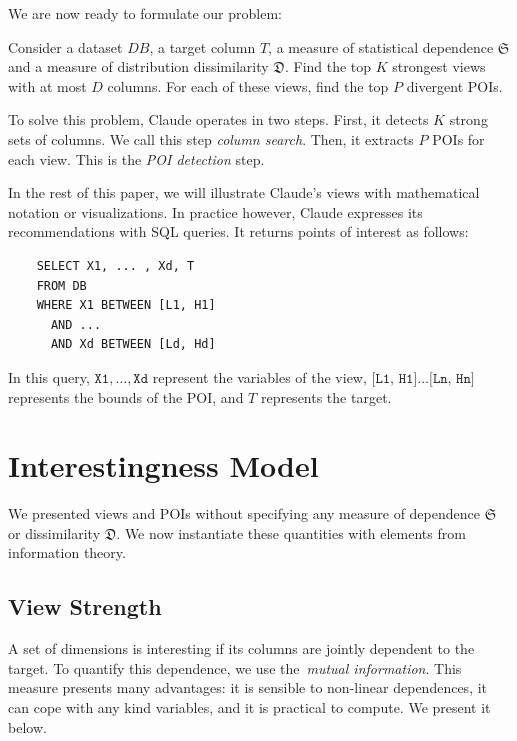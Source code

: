 We are now ready to formulate our problem:
\begin{problem}
Consider a dataset $DB$, a target column $T$, a measure of statistical
dependence $\mathfrak{S}$ and a measure of distribution dissimilarity
$\mathfrak{D}$. Find the top $K$ strongest views with at most $D$ columns. For
each of these views, find the top $P$ divergent POIs.
\end{problem}
To solve this problem, Claude operates in two steps. First, it detects $K$
strong sets of columns.  We call this step \emph{column search}.  Then, it
extracts $P$ POIs for each view. This is the \emph{POI detection} step.

In the rest of this paper, we will illustrate Claude's views with mathematical
notation or visualizations. In practice however, Claude expresses its
recommendations with SQL queries. It returns points of interest as follows:
\begin{verbatim}
    SELECT X1, ... , Xd, T
    FROM DB
    WHERE X1 BETWEEN [L1, H1]
      AND ... 
      AND Xd BETWEEN [Ld, Hd]
\end{verbatim}
In this query, $\texttt{X1},\ldots, \texttt{Xd}$ represent the variables of the
view, $\texttt{[L1, H1]}\ldots\texttt{[Ln, Hn]}$ represents the bounds of the
POI, and $T$ represents the target.




\section{Interestingness Model}
\label{sec:formalization}
We presented views and POIs without specifying any measure of dependence
$\mathfrak{S}$ or dissimilarity $\mathfrak{D}$. We now instantiate these
quantities with elements from information theory.

\subsection{View Strength}
\label{sec:view-strength}
A set of dimensions is interesting if its columns are jointly dependent to the
target. To quantify this dependence, we use the~\emph{mutual information}. This
measure presents many advantages: it is sensible to non-linear dependences, it
can cope with any kind variables, and it is practical to compute. We present it
below.

